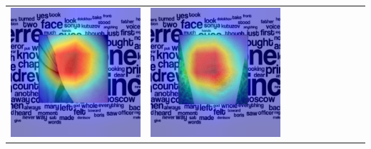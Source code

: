 \begin{landscape}
\begin{table}[]
\begin{tabular}{@{}c c c c c c c c c c@{}}
			\includegraphics[width=.12\textheight ,keepaspectratio]{images/pretraining/gradcam/3/EfficientNetB0CombinedGradCam.png} &
			\includegraphics[width=.12\textheight ,keepaspectratio]{images/pretraining/gradcam/9/EfficientNetB0CombinedGradCam.png} &

\end{tabular}
\end{table}
\end{landscape}
